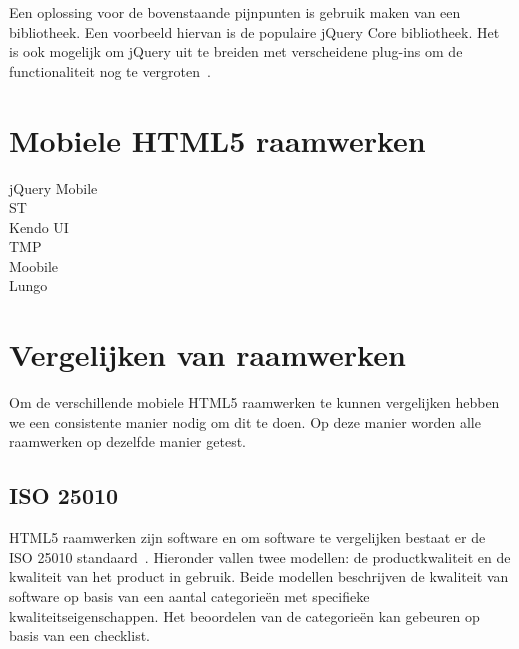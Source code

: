 Een oplossing voor de bovenstaande pijnpunten is gebruik maken van een bibliotheek. Een voorbeeld hiervan is de populaire jQuery Core bibliotheek. Het is ook mogelijk om jQuery uit te breiden met verscheidene plug-ins om de functionaliteit nog te vergroten~\cite{McFarland2011}.



\section{Mobiele HTML5 raamwerken}
\label{sec:mobiele-html5-raamwerken}
jQuery Mobile \\
ST\\
Kendo UI\\
TMP\\
Moobile\\
Lungo\\


\section{Vergelijken van raamwerken}
\label{sec:vergelijken-raamwerken}
Om de verschillende mobiele HTML5 raamwerken te kunnen vergelijken hebben we een consistente manier nodig om dit te doen.  Op deze manier worden alle raamwerken op dezelfde manier getest.

\subsection{ISO 25010}
HTML5 raamwerken zijn software en om software te vergelijken bestaat er de ISO 25010 standaard~\cite{Standard2010}.  Hieronder vallen twee modellen:  de productkwaliteit en de kwaliteit van het product in gebruik.  Beide modellen beschrijven de kwaliteit van software op basis van een aantal categorieën met specifieke kwaliteitseigenschappen. Het beoordelen van de categorieën kan gebeuren op basis van een checklist. 

